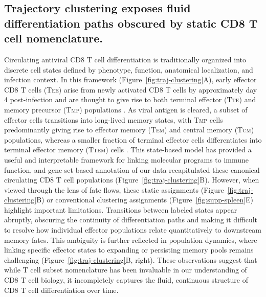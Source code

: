 \subsection{Trajectory clustering exposes fluid differentiation paths obscured by static CD8 T cell nomenclature.}

Circulating antiviral CD8 T cell differentiation is traditionally organized into discrete cell states defined by phenotype, function, anatomical localization, and infection context. In this framework (Figure~\ref{fig:traj-clustering}A), early effector CD8 T cells (T\textsc{ee}) arise from newly activated CD8 T cells by approximately day 4 post-infection and are thought to give rise to both terminal effector (T\textsc{te}) and memory precursor (T\textsc{mp}) populations \citep{milnerBromodomainProteinBRD42021, milnerDelineationMolecularlyDistinct2020}. As viral antigen is cleared, a subset of effector cells transitions into long-lived memory states, with T\textsc{mp} cells predominantly giving rise to effector memory (T\textsc{em}) and central memory (T\textsc{cm}) populations, whereas a smaller fraction of terminal effector cells differentiates into terminal effector memory (T\textsc{tem}) cells \citep{milnerDelineationMolecularlyDistinct2020, renkemaKLRG1MemoryCD82020}. This state-based model has provided a useful and interpretable framework for linking molecular programs to immune function, and gene set-based annotation of our data recapitulated these canonical circulating CD8 T cell populations (Figure~\ref{fig:traj-clustering}B). However, when viewed through the lens of fate flows, these static assignments (Figure~\ref{fig:traj-clustering}B) or conventional clustering assignments (Figure~\ref{fig:supp-spleen}E) highlight important limitations. Transitions between labeled states appear abruptly, obscuring the continuity of differentiation paths and making it difficult to resolve how individual effector populations relate quantitatively to downstream memory fates. This ambiguity is further reflected in population dynamics, where linking specific effector states to expanding or persisting memory pools remains challenging (Figure~\ref{fig:traj-clustering}B, right). These observations suggest that while T cell subset nomenclature has been invaluable in our understanding of CD8 T cell biology, it incompletely captures the fluid, continuous structure of CD8 T cell differentiation over time.

